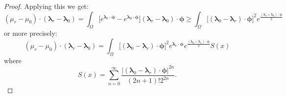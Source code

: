 \documentclass{article}
\def\vc#1{\mathbf{\boldsymbol{#1}}}     %
\def\tn#1{\boldsymbol{#1}}
\def\R{\mathbf{R}}
\def\vl{{\vc\lambda}}
\def\estvl{{\vc{\hat\lambda}}}
\def\vmu{\vc\mu}
\def\estvmu{{\vc{\hat\mu}}}
\def\vphi{\vc\phi}
\begin{document}
\begin{proof}
 


% 
% 
%  
% 
% 
% 
% 
%  
% 
%  
 
% 


Applying this we get:
\[
  (\mu_r - \mu_0) \cdot (\vl_r - \vl_0) =
  \int_\Omega \Big[ e^{\vl_r\cdot\vphi} - e^{\vl_0\cdot\vphi} \Big] (\vl_r - \vl_0) \cdot \vphi 
  \ge \int_\Omega  \big[ (\vl_0 - \vl_r) \cdot \vphi \big]^2 e^\frac{(\vl_r + \vl_0) \cdot \vphi}{2}
\]
or more precisely:
\[
  (\mu_r - \mu_0) \cdot (\vl_r - \vl_0) =
  \int_\Omega  \big[ (\vl_0 - \vl_r) \cdot \vphi \big]^2 e^{\vl_r\cdot\vphi} e^\frac{(\vl_0 - \vl_r) \cdot \vphi}{2} S(x)
\]
where
\[
  S(x) = \sum_{n=0}^\infty \frac{|(\vl_0 - \vl_r) \cdot \vphi|^{2n}}{(2n+1)!2^{2n}}.
\]






\end{proof}
\end{document}
